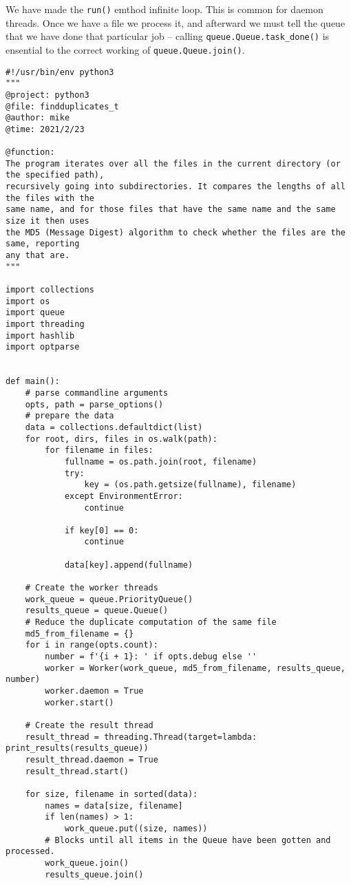 We have made the \verb|run()| emthod infinite loop.
This is common for daemon threads.
Once we have a file we process it, and afterward we must tell the queue that we have done that particular job -- calling \verb|queue.Queue.task_done()| is ensential to the correct working of \verb|queue.Queue.join()|.




\begin{lstlisting}
#!/usr/bin/env python3
"""
@project: python3
@file: findduplicates_t
@author: mike
@time: 2021/2/23
 
@function:
The program iterates over all the files in the current directory (or the specified path),
recursively going into subdirectories. It compares the lengths of all the files with the
same name, and for those files that have the same name and the same size it then uses
the MD5 (Message Digest) algorithm to check whether the files are the same, reporting
any that are.
"""

import collections
import os
import queue
import threading
import hashlib
import optparse


def main():
    # parse commandline arguments
    opts, path = parse_options()
    # prepare the data
    data = collections.defaultdict(list)
    for root, dirs, files in os.walk(path):
        for filename in files:
            fullname = os.path.join(root, filename)
            try:
                key = (os.path.getsize(fullname), filename)
            except EnvironmentError:
                continue

            if key[0] == 0:
                continue

            data[key].append(fullname)

    # Create the worker threads
    work_queue = queue.PriorityQueue()
    results_queue = queue.Queue()
    # Reduce the duplicate computation of the same file
    md5_from_filename = {}
    for i in range(opts.count):
        number = f'{i + 1}: ' if opts.debug else ''
        worker = Worker(work_queue, md5_from_filename, results_queue, number)
        worker.daemon = True
        worker.start()

    # Create the result thread
    result_thread = threading.Thread(target=lambda: print_results(results_queue))
    result_thread.daemon = True
    result_thread.start()

    for size, filename in sorted(data):
        names = data[size, filename]
        if len(names) > 1:
            work_queue.put((size, names))
        # Blocks until all items in the Queue have been gotten and processed.
        work_queue.join()
        results_queue.join()



\end{lstlisting}
